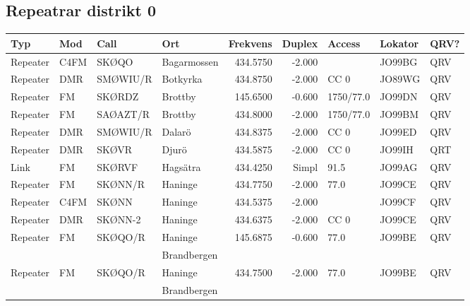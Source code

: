 \subsection{Repeatrar distrikt 0}

\scriptsize

\begin{longtable}{llllrrlll}
\bf Typ  & \bf Mod     & \bf Call & \bf Ort     & \bf Frekvens & \bf Duplex & \bf Access & \bf Lokator & \bf QRV? \\ \hline
Repeater & C4FM        & SKØQO    & Bagarmossen & 434.5750     & -2.000     &            & JO99BG      & QRV      \\
Repeater & DMR         & SMØWIU/R & Botkyrka    & 434.8750     & -2.000     & CC 0       & JO89WG      & QRV      \\
Repeater & FM          & SKØRDZ   & Brottby     & 145.6500     & -0.600     & 1750/77.0  & JO99DN      & QRV      \\
Repeater & FM          & SAØAZT/R & Brottby     & 434.8000     & -2.000     & 1750/77.0  & JO99BM      & QRV      \\
Repeater & DMR         & SMØWIU/R & Dalarö      & 434.8375     & -2.000     & CC 0       & JO99ED      & QRV      \\
Repeater & DMR         & SKØVR    & Djurö       & 434.5875     & -2.000     & CC 0       & JO99IH      & QRT      \\
Link     & FM          & SKØRVF   & Hagsätra    & 434.4250     & Simpl      & 91.5       & JO99AG      & QRV      \\
Repeater & FM          & SKØNN/R  & Haninge     & 434.7750     & -2.000     & 77.0       & JO99CE      & QRV      \\
Repeater & C4FM        & SKØNN    & Haninge     & 434.5375     & -2.000     &            & JO99CF      & QRV      \\
Repeater & DMR         & SKØNN-2  & Haninge     & 434.6375     & -2.000     & CC 0       & JO99CE      & QRV      \\
Repeater & FM          & SKØQO/R  & Haninge     & 145.6875     & -0.600     & 77.0       & JO99BE      & QRV      \\
         &             &          & Brandbergen &              &            &            &             &          \\
Repeater & FM          & SKØQO/R  & Haninge     & 434.7500     & -2.000     & 77.0       & JO99BE      & QRV      \\
         &             &          & Brandbergen &              &            &            &             &          \\

\end{longtable}
